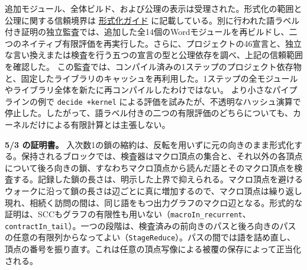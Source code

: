 \documentclass[11pt,reqno]{amsart}
\theoremstyle{definition}
\theoremstyle{definition}
\theoremstyle{remark}
\begin{document}
追加モジュール、全体ビルド、および公理の表示は受理された。形式化の範囲と公理に関する信頼境界は \href{supplement/FORMALIZATION.md}{形式化ガイド} に記載している。別に行われた語ラベル付き証明の独立監査では、追加した全14個のWordモジュールを再ビルドし、二つのネイティブ有限評価を再実行した。さらに、プロジェクトの46宣言と、独立な言い換えまたは検査を行う五つの宣言の型と公理依存を調べ、上記の信頼範囲を確認した。
この監査では、コンパイル済みの1ステップのプロジェクト依存物と、固定したライブラリのキャッシュを再利用した。1ステップの全モジュールやライブラリ全体を新たに再コンパイルしたわけではない。
より小さなパイプラインの例で \texttt{decide\ +kernel} による評価を試みたが、不透明なハッシュ演算で停止した。したがって、語ラベル付きの二つの有限評価のどちらについても、カーネルだけによる有限計算とは主張しない。

\textbf{5/3 の証明書。} 入次数1の鎖の縮約は、反転を用いずに元の向きのまま形式化する。保持されるブロックでは、検査器はマクロ頂点の集合と、それ以外の各頂点について後ろ向きの鎖、すなわちマクロ頂点から読んだ語とそのマクロ頂点を検査する。記録した鎖の長さは、明示した上界で抑えられる。マクロ頂点を避けるウォークに沿って鎖の長さは辺ごとに真に増加するので、マクロ頂点は繰り返し現れ、相続く訪問の間は、同じ語をもつ出力グラフのマクロ辺となる。形式的な証明は、SCCもグラフの有限性も用いない（\nolinkurl{macroIn_recurrent}、\nolinkurl{contractIn_tail}）。一つの段階は、検査済みの前向きのパスと後ろ向きのパスの任意の有限列からなってよい（\nolinkurl{StageReduce}）。パスの間では語を詰め直し、頂点の番号を振り直す。これは任意の頂点写像による被覆の保存によって正当化される。
\end{document}
